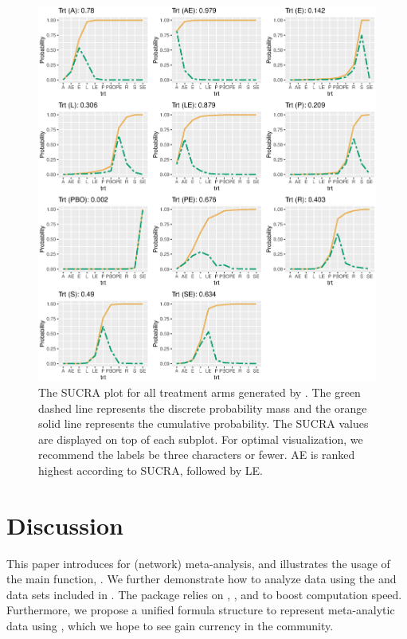 \begin{figure}[!htbp]
  \centering
  \includegraphics[scale=0.6]{sucra.eps}
  \caption{The SUCRA plot for all treatment arms generated by . The green dashed line represents the discrete probability mass and the orange solid line represents the cumulative probability. The SUCRA values are displayed on top of each subplot. For optimal visualization, we recommend the labels be three characters or fewer. AE is ranked highest according to SUCRA, followed by LE.}\label{fig:sucraplot}
\end{figure}

\section[Discussion]{Discussion}\label{sec:discussion}
This paper introduces  for (network) meta-analysis, and illustrates the usage of the main function, . We further demonstrate how to analyze data using the  and  data sets included in . The package relies on , , and  to boost computation speed. Furthermore, we propose a unified formula structure to represent meta-analytic data using , which we hope to see gain currency in the community.

